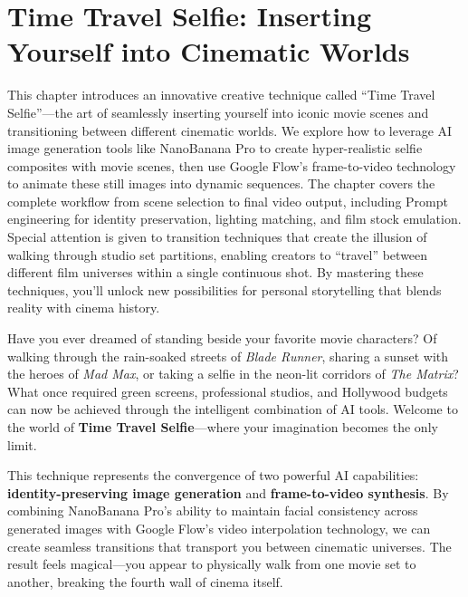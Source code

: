 \chapter{Time Travel Selfie: Inserting Yourself into Cinematic Worlds}
\label{ch:time-travel-selfie}

\begin{chapterabstract}
This chapter introduces an innovative creative technique called ``Time Travel Selfie''—the art of seamlessly inserting yourself into iconic movie scenes and transitioning between different cinematic worlds. We explore how to leverage AI image generation tools like NanoBanana Pro to create hyper-realistic selfie composites with movie scenes, then use Google Flow's frame-to-video technology to animate these still images into dynamic sequences. The chapter covers the complete workflow from scene selection to final video output, including Prompt engineering for identity preservation, lighting matching, and film stock emulation. Special attention is given to transition techniques that create the illusion of walking through studio set partitions, enabling creators to ``travel'' between different film universes within a single continuous shot. By mastering these techniques, you'll unlock new possibilities for personal storytelling that blends reality with cinema history.
\end{chapterabstract}

Have you ever dreamed of standing beside your favorite movie characters? Of walking through the rain-soaked streets of \textit{Blade Runner}, sharing a sunset with the heroes of \textit{Mad Max}, or taking a selfie in the neon-lit corridors of \textit{The Matrix}? What once required green screens, professional studios, and Hollywood budgets can now be achieved through the intelligent combination of AI tools. Welcome to the world of \textbf{Time Travel Selfie}—where your imagination becomes the only limit.

This technique represents the convergence of two powerful AI capabilities: \textbf{identity-preserving image generation} and \textbf{frame-to-video synthesis}. By combining NanoBanana Pro's ability to maintain facial consistency across generated images with Google Flow's video interpolation technology, we can create seamless transitions that transport you between cinematic universes. The result feels magical—you appear to physically walk from one movie set to another, breaking the fourth wall of cinema itself.

